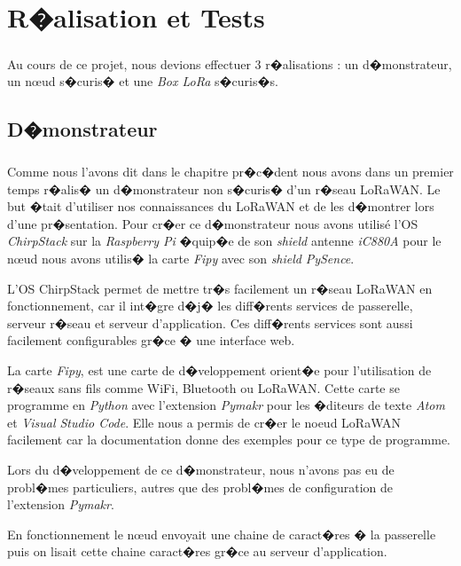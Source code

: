 \documentclass[a4paper, titlepage,12pt]{report}
\begin{document}
\chapter{R�alisation et Tests}
\paragraph{}  

Au cours de ce projet, nous devions effectuer 3 r�alisations : un d�monstrateur, un n\oe{}ud s�curis� et une \textit{Box LoRa} s�curis�s.



\section{D�monstrateur}
\paragraph{}
Comme nous l'avons dit dans le chapitre pr�c�dent nous avons dans un premier temps r�alis� un d�monstrateur non s�curis� d'un r�seau LoRaWAN. Le but �tait d'utiliser nos connaissances du LoRaWAN et de les d�montrer lors d'une pr�sentation. Pour cr�er ce d�monstrateur nous avons utilisé l'OS \textit{ChirpStack}\cite{chirpstarksite} sur la \textit{Raspberry Pi} �quip�e de son \textit{shield} antenne \textit{iC880A} pour le n\oe{}ud nous avons utilis� la carte \textit{Fipy}\cite{fipysite} avec son \textit{shield} \textit{PySence}.

L'OS ChirpStack permet de mettre tr�s facilement un r�seau LoRaWAN en fonctionnement, car il int�gre d�j� les diff�rents services de passerelle, serveur r�seau et serveur d'application. Ces diff�rents services sont aussi facilement configurables gr�ce � une interface web.

La carte \textit{Fipy}, est une carte de d�veloppement orient�e pour l'utilisation de r�seaux sans fils comme WiFi, Bluetooth ou LoRaWAN. Cette carte se programme en \textit{Python} avec l'extension \textit{Pymakr} pour les �diteurs de texte \textit{Atom} et \textit{Visual Studio Code}.
Elle nous a permis de cr�er le noeud LoRaWAN facilement car la documentation donne des exemples pour ce type de programme.

Lors du d�veloppement de ce d�monstrateur, nous n'avons pas eu de probl�mes particuliers, autres que des probl�mes de configuration de l'extension \textit{Pymakr}.

En fonctionnement le n\oe{}ud envoyait une chaine de caract�res � la passerelle puis on lisait cette chaine caract�res gr�ce au serveur d'application. 
\end{document}

